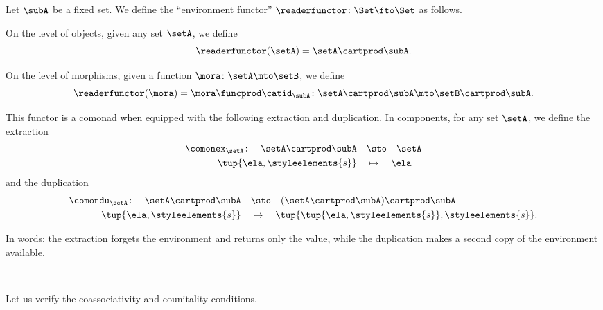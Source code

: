\begin{example}
\label{exa:product-comonad}

Let $\subA$ be a fixed set. We define the ``environment functor'' $\readerfunctor \colon \Set \fto \Set$ as follows.

On the level of objects, given any set $\setA$, we define
\begin{equation}
\readerfunctor(\setA) = \setA \cartprod \subA.
\end{equation}

On the level of morphisms, given a function $\mora \colon \setA \mto \setB$, we define
\begin{equation}
\readerfunctor(\mora) = \mora \funcprod \catid_{\subA} \colon \setA \cartprod \subA \mto \setB \cartprod \subA.
\end{equation}

This functor is a comonad when equipped with the following extraction and duplication. In components, for any set $\setA$, we define the extraction
\begin{equation}\label{eq:product-comonad-extraction}
    \begin{aligned}
        \comonex_\setA \colon \quad \setA \cartprod \subA \quad & \sto \quad \setA \\
        \tup{\ela, \styleelements{s}} \quad & \mapsto \quad \ela
    \end{aligned}
\end{equation}
and the duplication
\begin{equation}\label{eq:product-comonad-duplication}
    \begin{aligned}
        \comondu_\setA \colon \quad \setA \cartprod \subA \quad & \sto \quad (\setA \cartprod \subA) \cartprod \subA \\
        \tup{\ela, \styleelements{s}} \quad & \mapsto \quad \tup{\tup{\ela, \styleelements{s}}, \styleelements{s}}.
    \end{aligned}
\end{equation}

In words: the extraction forgets the environment and returns only the value, while the duplication makes a second copy of the environment available.

\

Let us verify the coassociativity and counitality conditions.


\end{example}
